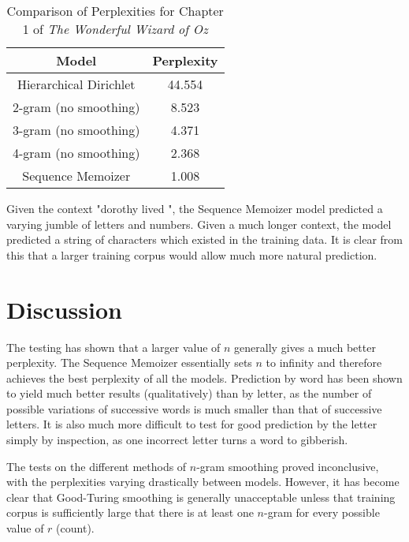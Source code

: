 \begin{table}
\caption{Comparison of Perplexities for Chapter 1 of \textit{The Wonderful Wizard of Oz}}
\label{table:chapterOnePerplexities}
\begin{center}
\begin{tabular}{|c|c|}
\hline
\textbf{Model} & \textbf{Perplexity} \\ \hline
Hierarchical Dirichlet & 44.554 \\ \hline
2-gram (no smoothing) & 8.523 \\ \hline
3-gram (no smoothing) & 4.371 \\ \hline
4-gram (no smoothing) & 2.368 \\ \hline

Sequence Memoizer & 1.008 \\ \hline
\end{tabular} 
\end{center} 
\end{table}

Given the context "dorothy lived ", the Sequence Memoizer model predicted a varying jumble of letters and numbers. Given a much longer context, the model predicted a string of characters which existed in the training data. It is clear from this that a larger training corpus would allow much more natural prediction.  

\section{Discussion}

The testing has shown that a larger value of $n$ generally gives a much better perplexity. The Sequence Memoizer essentially sets $n$ to infinity and therefore achieves the best perplexity of all the models. Prediction by word has been shown to yield much better results (qualitatively) than by letter, as the number of possible variations of successive words is much smaller than that of successive letters. It is also much more difficult to test for good prediction by the letter simply by inspection, as one incorrect letter turns a word to gibberish. 

The tests on the different methods of $n$-gram smoothing proved inconclusive, with the perplexities varying drastically between models. However, it has become clear that Good-Turing smoothing is generally unacceptable unless that training corpus is sufficiently large that there is at least one $n$-gram for every possible value of $r$ (count).


